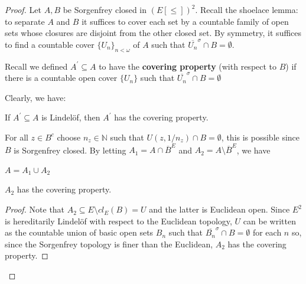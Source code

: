 \documentclass[10pt,a4paper]{amsart}
\newcommand{\N}{\mathbb{N}}
\begin{document}
\begin{proof}
    Let $A,B$ be Sorgenfrey closed in $(E[\leq])^2$. Recall the shoelace lemma: to separate $A$ and $B$ it suffices to cover each set by a countable family of open sets whose closures are disjoint from the other closed set. By symmetry, it suffices to find a countable cover $\{U_n\}_{n<\omega}$ of $A$ such that $\overline{U_n}^\sigma\cap B=\emptyset$.  
    
    
   Recall we defined 
        $A^\prime\subseteq A$ to have the \textbf{covering property} (with respect to $B$) if there is a countable open cover $\{U_n\}$ such that $\overline{U_n}^\sigma\cap B=\emptyset$ 

    Clearly, we have: 
    \begin{lemma}\label{lem:lindelof}
        If $A^\prime\subseteq A$ is Lindel\"of, then $A^\prime$ has the covering property.
    \end{lemma}
    For all $z\in B^c$ choose $n_z\in \N$ such that $U(z,1/n_z)\cap B=\emptyset$, this is possible since $B$ is Sorgenfrey closed.
 By letting $A_1= A\cap \overline{B}^E$ and $A_2= A\setminus \overline{B}^E$, we have 
    \begin{simplebox}
    \begin{observation}
    $A=A_1\cup A_2$
    \end{observation}
    \end{simplebox}
    \begin{claim}\label{clm:eu_open}
        $A_2$ has the covering property.
    \end{claim}
    \begin{proof}
        Note that $A_2 \subseteq E\setminus cl_E(B)=U$ and the latter is Euclidean open. Since $E^2$ is hereditarily Lindel\"of with respect to the Euclidean topology, $U$ can be written as the countable union of basic open sets $B_n$ such that $\overline{B_n}^\sigma\cap B=\emptyset$ for each $n$ so, since the Sorgenfrey topology is finer than the Euclidean, $A_2$ has the covering property. 

\end{proof}
\end{proof}
\end{document}
